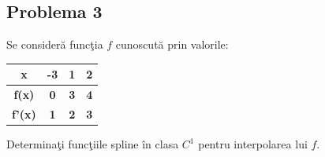 \documentclass{exam}
\begin{document}

\subsection{Problema 3}

Se consideră funcţia $f$ cunoscută prin valorile:
\begin{center}
	\begin{tabular}{c || c | c | c}
		\textbf{x}     & \textbf{-3} & \textbf{1} & \textbf{2} \\
		\hline
		\textbf{f(x)}  & \textbf{0}  & \textbf{3} & \textbf{4} \\
		\hline
		\textbf{f'(x)} & \textbf{1}  & \textbf{2} & \textbf{3} \\
	\end{tabular}
\end{center}

Determinaţi funcţiile spline în clasa $C^1$ pentru interpolarea lui $f$.
\end{document}
